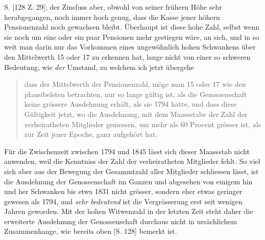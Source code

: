 S. [128 Z. 29]; der Zinsfuss aber, obwohl von seiner frühern Höhe sehr herabgegangen, noch immer hoch genug, dass die Kasse jener höhern Pensionenzahl noch gewachsen bleibt. Überhaupt ist diese hohe Zahl, selbst wenn sie noch um eine oder ein paar Pensionen mehr gestiegen wäre, an sich, und in so weit man darin nur das Vorkommen eines ungewöhnlich hohen Schwankens über den Mittelwerth 15 oder 17 zu erkennen hat, lange nicht von einer so schweren Bedeutung, wie \textit{der} Umstand, zu welchem ich jetzt übergehe
\begin{quote}
dass der Mittelwerth der Pensionenzahl, möge man 15 oder 17 wie den plausibelsten betrachten, nur so lange gültig ist, als die Genossenschaft keine grössere Ausdehnung erhält, als sie 1794 hatte, und dass diese Gültigkeit jetzt, wo die Ausdehnung, mit dem Maassstabe der Zahl der verheiratheten Mitglieder gemessen, um mehr als 60 Procent grösser ist, als zur Zeit jener Epoche, ganz aufgehört hat.
\end{quote}
\noindent\hspace*{\parindent}Für die Zwischenzeit zwischen 1794 und 1845 lässt sich dieser Maassstab nicht anwenden, weil die Kenntniss der Zahl der verheiratheten Mitglieder fehlt. So viel sich aber aus der Bewegung der Gesammtzahl aller Mitglieder schliessen lässt, ist die Ausdehnung der Genossenschaft im Ganzen und abgesehen von einigem hin und her Schwanken bis etwa 1831 nicht grösser, sondern eher etwas geringer gewesen als 1794, und \textit{sehr bedeutend} ist die Vergrösserung erst seit wenigen Jahren geworden. Mit der hohen Witwenzahl in der letzten Zeit steht daher die erweiterte Ausdehnung der Genossenschaft durchaus nicht in ursächlichem Zusammenhange, wie bereits oben [S. 128] bemerkt ist.

